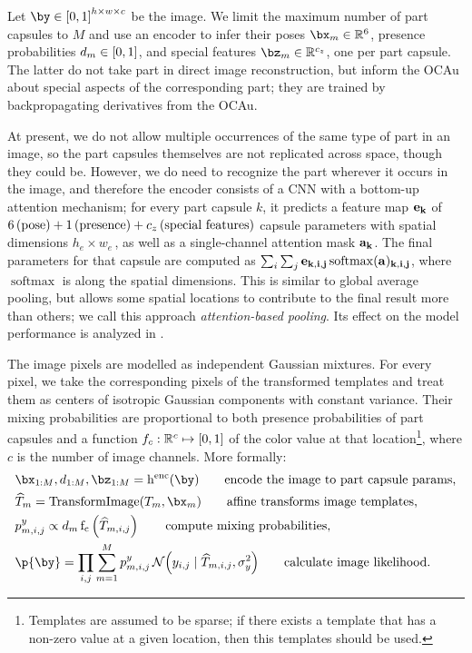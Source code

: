 Let $\by \in \interval{0, 1}^{h \times w \times c}$ be the image.
We limit the maximum number of part capsules to $M$ and use an encoder to infer their poses $\bx_m \in \RR^6$, presence probabilities $d_m \in {\left[0, 1\right]}$, and special features $\bz_m \in \RR^{c_z}$, one per part capsule.
The latter do not take part in direct image reconstruction, but inform the \gls{OCAu} about special aspects of the corresponding part; they are trained by backpropagating derivatives from the \gls{OCAu}.

At present, we do not allow multiple occurrences of the same type of part in an image, so the part capsules themselves are not replicated across space, though they could be.
However, we do need to recognize the part wherever it occurs in the image, and therefore the encoder consists of a \gls{CNN} with a bottom-up attention mechanism; for every part capsule $k$, it predicts a feature map $\bf{e}_k$ of $6 \text{\,(pose)} + 1 \text{\,(presence)} + c_z \text{\,(special features)}$ capsule parameters with spatial dimensions $h_e \times w_e$\,, as well as a single-channel attention mask $\bf{a}_k$.
The final parameters for that capsule are computed as $\sum_{i} \sum_j \bf{e}_{k, i,j} \operatorname{softmax}(\bf{a})_{k,i,j}$, where $\operatorname{softmax}$ is along the spatial dimensions.
This is similar to global average pooling, but allows some spatial locations to contribute to the final result more than others; we call this approach \textit{attention-based pooling}. Its effect on the model performance is analyzed in .

The image pixels are modelled as independent Gaussian mixtures.
For every pixel, we take the corresponding pixels of the transformed templates and treat them as centers of isotropic Gaussian components with constant variance.
Their mixing probabilities are proportional to both presence probabilities of part capsules and a function $f_c: \mathbb{R}^c \mapsto {\left[0, 1\right]}$ of the color value at that location\footnote{
Templates are assumed to be sparse; if there exists a template that has a non-zero value at a given location, then this templates should be used.}, where $c$ is the number of image channels. 
More formally:
\begin{align}
    &\bx_{1:M}, d_{1:M}, \bz_{1:M} = \operatorname{h^{\mathrm{enc}}}(\by) \qquad\text{encode the image to part capsule params,}\\
    &\widehat{T}_m = \operatorname{TransformImage} (T_m, \bx_m)  \qquad\text{affine transforms image templates,}\\
    &p^y_{m,i,j} \propto d_m \operatorname{f_c}\left(\widehat{T}_{m,i,j}\right) \qquad\text{compute mixing probabilities,}\\
    &\p{\by} = \prod_{i,j} \sum_{m=1}^M p^y_{m,i,j}\, \gauss{y_{i,j} \mid \widehat{T}_{m,i,j}, \sigma^2_y} \qquad\text{calculate image likelihood.} \label{eq:im_likelihood}
\end{align}

